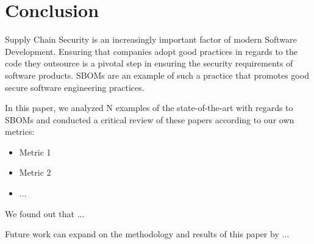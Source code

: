 \section{Conclusion}

Supply Chain Security is an increasingly important factor of modern Software Development. Ensuring that companies adopt good practices in regards to the code they outsource is a pivotal step in ensuring the security requirements of software products. SBOMs \cite{article:concept:sbom-2} are an example of such a practice that promotes good secure software engineering practices.

\noindent In this paper, we analyzed N examples of the state-of-the-art with regards to SBOMs and conducted a critical review of these papers according to our own metrics:
\begin{itemize}
    \item Metric 1
    \item Metric 2
    \item ...
\end{itemize}

\noindent We found out that ...

\noindent Future work can expand on the methodology and results of this paper by ...